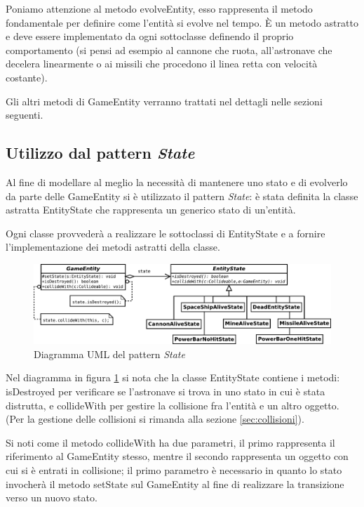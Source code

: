 \documentclass[a4paper,12pt]{article}
\begin{document}
Poniamo attenzione al metodo \textsf{evolveEntity}, esso rappresenta il metodo fondamentale per definire come l'entit\`a si evolve nel tempo. \`E un metodo astratto e deve essere implementato da ogni sottoclasse definendo il proprio comportamento (si pensi ad esempio al cannone che ruota, all'astronave che decelera linearmente o ai missili che procedono il linea retta con velocit\`a costante).

Gli altri metodi di \textsf{GameEntity} verranno trattati nel dettagli nelle sezioni seguenti.

\subsection{Utilizzo dal pattern \emph{State}}
\label{sec:state}

Al fine di modellare al meglio la necessit\`a di mantenere uno stato e di evolverlo da parte delle \textsf{GameEntity} si \`e utilizzato il pattern \emph{State}: \`e stata definita la classe astratta \textsf{EntityState} che rappresenta un generico stato di un'entit\`a.

Ogni classe provveder\`a a realizzare le sottoclassi di \textsf{EntityState} e a fornire l'implementazione dei metodi astratti della classe.

\begin{figure}[h]
\centering
\includegraphics[width=15cm]{State.pdf}
\caption{Diagramma UML del pattern \emph{State}}
\label{img:State}
\end{figure}

Nel diagramma in figura \ref{img:State} si nota che la classe \textsf{EntityState} contiene i metodi: \textsf{isDestroyed} per verificare se l'astronave si trova in uno stato in cui \`e stata distrutta, e \textsf{collideWith} per gestire la collisione fra l'entit\`a e un altro oggetto. (Per la gestione delle collisioni si rimanda alla sezione \ref{sec:collisioni}).

Si noti come il metodo \textsf{collideWith} ha due parametri, il primo rappresenta il riferimento al \textsf{GameEntity} stesso, mentre il secondo rappresenta un oggetto con cui si \`e entrati in collisione; il primo parametro \`e necessario in quanto lo stato invocher\`a il metodo \textsf{setState} sul \textsf{GameEntity} al fine di realizzare la transizione verso un nuovo stato.
\end{document}
